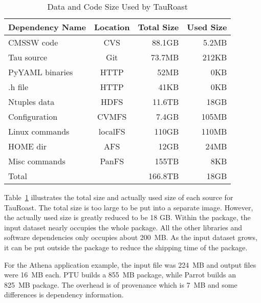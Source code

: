 \begin{table}
\small
	\centering
	    \begin{tabular}{lcrr}
	        \hline
	        \bf Dependency Name & \bf Location & \bf Total Size &  \bf Used Size\\ 
	        \hline
	        CMSSW code     & CVS & 88.1GB &  5.2MB\\ \hline
	        Tau source       & Git & 73.7MB & 212KB \\ \hline
	        PyYAML binaries    & HTTP & 52MB& 0KB \\ \hline
	        .h file       & HTTP& 41KB & 0KB \\ \hline 
	        Ntuples data    & HDFS& 11.6TB & 18GB \\ \hline
	        Configuration & CVMFS & 7.4GB & 105MB \\ \hline
	        Linux commands & localFS & 110GB & 110MB \\ \hline     
	        HOME dir& AFS &12GB & 24MB\\ \hline
	        Misc commands & PanFS & 155TB & 8KB \\ \hline
	        Total      &    & 166.8TB     &  18GB \\ \hline
	    \end{tabular}
	    \normalsize
	    \caption{Data and Code Size Used by TauRoast}
	    \label{table:size-original-real}
\end{table}
	   
Table~\ref{table:size-original-real} illustrates the total size and actually used size of each source for TauRoast. 
The total size is too large to be put into a separate image. However, the actually used size is greatly reduced to be 18 GB.
Within the package, the input dataset nearly occupies the whole package. All the other libraries and software dependencies only occupies about 200~MB.
As the input dataset grows, it can be put outside the package to reduce the shipping time of the package.

For the Athena application example, the input file was 224~MB and output files were 16~MB each. PTU builds a 855~MB package, while Parrot builds an 825~MB package. The overhead is of provenance which is 7~MB and some differences is dependency information. 
